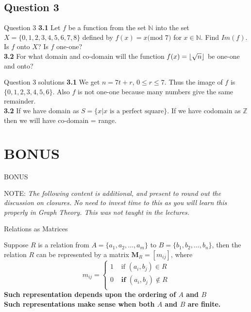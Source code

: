 \documentclass[xcolor=svgnames]{beamer}
\DeclarePairedDelimiter\floor{\lfloor}{\rfloor}
\begin{document}
\subsection{Question 3}

\begin{frame}{Question 3}
    \textbf{3.1} Let $f$ be a function from the set $\mathbb{N}$ into the set $X = \{0, 1, 2, 3, 4, 5, 6, 7, 8\}$ defined by $f(x) = x \text{(mod 7)}$ for $x \in \mathbb{N}$. Find $Im(f)$. Is $f$ onto $X$? Is $f$ one-one? \\
    \textbf{3.2} For what domain and co-domain will the function $f(x) = \floor{\sqrt{n}}$ be one-one and onto? \\
\end{frame}

\begin{frame}{Question 3 solutions}
    \textbf{3.1} We get $n = 7t + r$, $0 \leq r \leq 7$. Thus the image of $f$ is $\{0, 1, 2, 3, 4, 5, 6\}$. Also $f$ is not one-one because many numbers give the same remainder.\\ 
    \textbf{3.2} If we have domain as $S = \{x | x \text{ is a perfect square}\}$. If we have codomain as $\mathbb{Z}$ then we will have co-domain = range.
\end{frame}

\section{BONUS}

\begin{frame}{BONUS}
    \begin{alertblock}{NOTE:}
        \textit{The following content is additional, and present to round out the discussion on closures. No need to invest time to this as you will learn this properly in Graph Theory. This was not taught in the lectures.}
    \end{alertblock}
\end{frame}

\begin{frame}{Relations as Matrices}
    \begin{definition}
        Suppose $R$ is a relation from $A = \{a_1, a_2, \ldots, a_m\}$ to $B=\{b_1, b_2, \ldots, b_n\}$, then the relation $R$ can be represented by a matrix $\boldsymbol{M}_R = [m_{ij}]$, where
        \[
            m_{ij} = 
            \begin{cases}
                1 & \text{ if } (a_i, b_j) \in R \\
                0 & \textbf{ if } (a_i, b_j) \notin R \\
            \end{cases}
        \]
        \textbf{Such representation depends upon the ordering of $A$ and $B$} \\
        \textbf{Such representations make sense when both $A$ and $B$ are finite.}
    \end{definition}
\end{frame}
\end{document}
